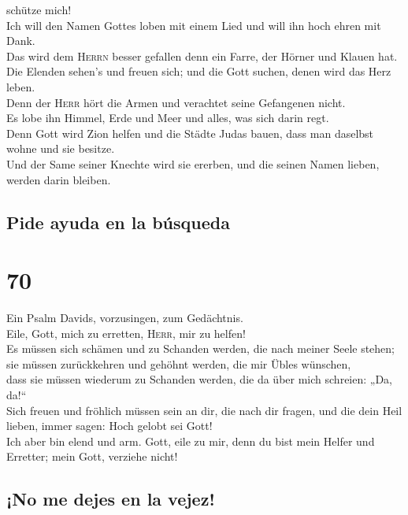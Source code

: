 schütze mich!\\
 Ich will den Namen Gottes loben mit einem Lied und will
ihn hoch ehren mit Dank.\\
 Das wird dem \textsc{Herrn} besser gefallen denn ein
Farre, der Hörner und Klauen hat.\\
 Die Elenden sehen's und freuen sich; und die Gott
suchen, denen wird das Herz leben.\\
 Denn der \textsc{Herr} hört die Armen und verachtet
seine Gefangenen nicht.\\
 Es lobe ihn Himmel, Erde und Meer und alles, was sich
darin regt.\\
 Denn Gott wird Zion helfen und die Städte Judas bauen,
dass man daselbst wohne und sie besitze.\\
 Und der Same seiner Knechte wird sie ererben, und die
seinen Namen lieben, werden darin bleiben.

\hypertarget{pide-ayuda-en-la-buxfasqueda}{%
\subsection{Pide ayuda en la
búsqueda}\label{pide-ayuda-en-la-buxfasqueda}}

\hypertarget{section-69}{%
\section{70}\label{section-69}}

 Ein Psalm Davids, vorzusingen, zum Gedächtnis.\\
 Eile, Gott, mich zu erretten, \textsc{Herr}, mir zu
helfen!\\
 Es müssen sich schämen und zu Schanden werden, die nach
meiner Seele stehen; sie müssen zurückkehren und gehöhnt werden, die mir
Übles wünschen,\\
 dass sie müssen wiederum zu Schanden werden, die da über
mich schreien: „Da, da!{}``\\
 Sich freuen und fröhlich müssen sein an dir, die nach dir
fragen, und die dein Heil lieben, immer sagen: Hoch gelobt sei Gott!\\
 Ich aber bin elend und arm. Gott, eile zu mir, denn du
bist mein Helfer und Erretter; mein Gott, verziehe nicht!

\hypertarget{no-me-dejes-en-la-vejez}{%
\subsection{¡No me dejes en la vejez!}\label{no-me-dejes-en-la-vejez}}


